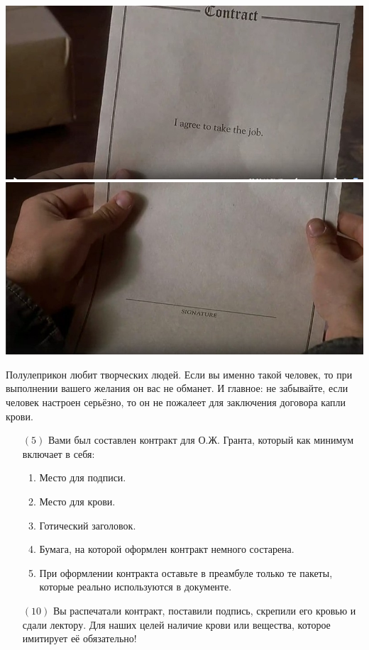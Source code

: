 \documentclass[12pt, a4paper, oneside]{article}
\begin{document}
\begin{center}
	\includegraphics[scale=0.4]{Hg91uSv1cik.jpg}
	\includegraphics[scale=0.4]{t_XxgIqEmBE.jpg}
\end{center} 

Полулеприкон любит творческих людей. Если вы именно такой человек, то при выполнении вашего желания он вас не обманет. И главное: не забывайте, если человек настроен серьёзно, то он не пожалеет для заключения договора капли крови.

\begin{itemize}
	\item[$(5)$]   Вами был составлен контракт для О.Ж. Гранта, который как минимум включает в себя:
	
	\begin{enumerate}
		\item  Место для подписи.
		\item  Место для крови.
		\item  Готический заголовок.
		\item  Бумага, на которой оформлен контракт немного состарена.
		\item  При оформлении контракта оставьте в преамбуле только те пакеты, которые реально используются в документе.
	\end{enumerate}
	
	\item[$(10)$] Вы распечатали контракт, поставили подпись, скрепили его кровью и сдали лектору. Для наших целей наличие крови или вещества, которое имитирует её обязательно!
\end{itemize}
\end{document}
